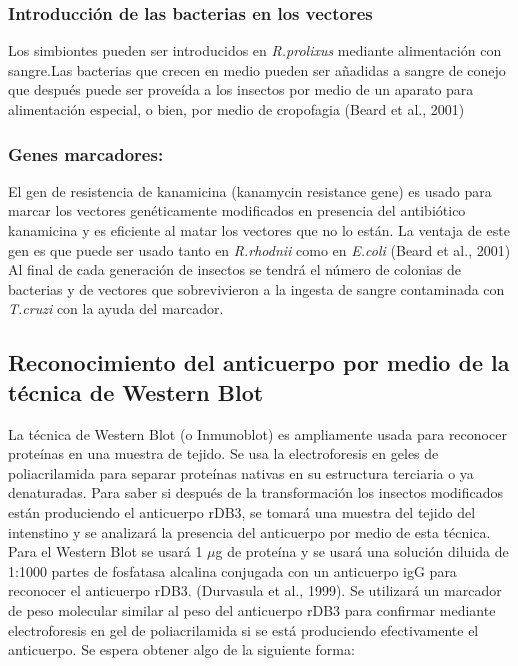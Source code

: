 \documentclass[12pt]{article}
\numberwithin{equation}{section}
\begin{document}
\subsubsection{Introducción de las bacterias en los vectores}

Los simbiontes pueden ser introducidos en \textit{R.prolixus} mediante alimentación con sangre.Las bacterias que crecen en medio pueden ser añadidas a sangre de conejo que después puede ser proveída a los insectos por medio de un aparato para alimentación especial, o bien, por medio de cropofagia (Beard et al., 2001)

\subsubsection{Genes marcadores:}
El gen de resistencia de kanamicina (kanamycin resistance gene) es usado para marcar los vectores genéticamente modificados en presencia del antibiótico kanamicina y es eficiente al matar los vectores que no lo están. La ventaja de este gen es que puede ser usado tanto en \textit{R.rhodnii} como en \textit{E.coli} (Beard et al., 2001) Al final de cada generación de insectos se tendrá el número de colonias de bacterias y de vectores que sobrevivieron a la ingesta de sangre contaminada con \textit{T.cruzi} con la ayuda del marcador.

\subsection{Reconocimiento del anticuerpo por medio de la técnica de Western Blot}
La técnica de Western Blot (o Inmunoblot) es ampliamente usada para reconocer proteínas en una muestra de tejido. Se usa la electroforesis en geles de poliacrilamida para separar proteínas nativas en su estructura terciaria o ya denaturadas. Para saber si después de la transformación los insectos modificados están produciendo el anticuerpo rDB3, se tomará una muestra del tejido del intenstino y se analizará la presencia del anticuerpo por medio de esta técnica. Para el Western Blot se usará 1 $\mu$g de proteína y se usará una solución diluida de 1:1000 partes de fosfatasa alcalina conjugada con un anticuerpo igG para reconocer el anticuerpo rDB3. (Durvasula et al., 1999).
Se utilizará un marcador de peso molecular similar al peso del anticuerpo rDB3 para confirmar mediante electroforesis en gel de poliacrilamida si se está produciendo efectivamente el anticuerpo. Se espera obtener algo de la siguiente forma:
\end{document}
